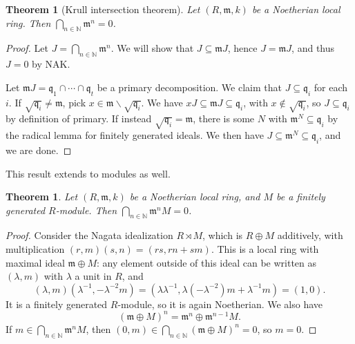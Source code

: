 \documentclass{amsart}[12pt]
\def\ann{\operatorname{ann}}
\newcommand{\N}{\mathbb{N}}
\newcommand{\NN}{\mathbb{N}}
\newcommand{\m}{{\mathfrak m}}
\newcommand{\q}{{\mathfrak q}}
\numberwithin{equation}{section}
\theoremstyle{plain} %
\newtheorem{thm}[equation]{Theorem}
\newtheorem{theorem}[equation]{Theorem}
\theoremstyle{definition}
\theoremstyle{remark}
\begin{document}
\begin{theorem}[Krull intersection theorem]
	Let $(R,\m,k)$ be a Noetherian local ring. Then $\bigcap_{n \in \NN} \m^n = 0$.
\end{theorem}
\begin{proof} Let $J=\bigcap_{n \in \NN} \m^n$. We will show that $J \subseteq \m J$, hence $J=\m J$, and thus $J=0$ by NAK.
	
	Let $\m J=\q_1 \cap  \cdots \cap \q_t$ be a primary decomposition. We claim that $J \subseteq \q_i$ for each $i$. If $\sqrt{\q_i}\neq \m$, pick $x\in \m \smallsetminus \sqrt{\q_i}$. We have $xJ \subseteq \m J \subseteq \q_i$, with $x\notin \sqrt{\q_i}$, so $J \subseteq \q_i$ by definition of primary. If instead $\sqrt{\q_i}=\m$, there is some $N$ with $\m^N\subseteq \q_i$ by the radical lemma for finitely generated ideals. We then have $J \subseteq \m^N\subseteq \q_i$, and we are done.
\end{proof}



This result extends to modules as well.

\begin{thm} Let $(R,\m,k)$ be a Noetherian local ring, and $M$ be a finitely generated $R$-module. Then $\bigcap_{n \in \NN} \m^n M = 0$.
\end{thm}
\begin{proof} Consider the Nagata idealization $R \rtimes M$, which is $R \oplus M$ additively, with multiplication $(r,m)(s,n) =(rs, rn+sm)$. This is a local ring with maximal ideal $\m \oplus M$: any element outside of this ideal can be written as $(\lambda, m )$ with $\lambda$ a unit in $R$, and \[(\lambda, m )(\lambda^{-1}, -\lambda^{-2} m) = (\lambda \lambda^{-1},  \lambda (-\lambda^{-2}) m + \lambda^{-1} m )= (1,0).\] It is a finitely generated $R$-module, so it is again Noetherian. We also have
\[ (\m \oplus M)^n = \m^n \oplus \m^{n-1} M.\]
If $m\in \bigcap_{n\in\N} \m^n M$, then $(0,m)\in\bigcap_{n\in\N} (\m \oplus M)^n =0$, so $m=0$.
\end{proof}

\end{document}
